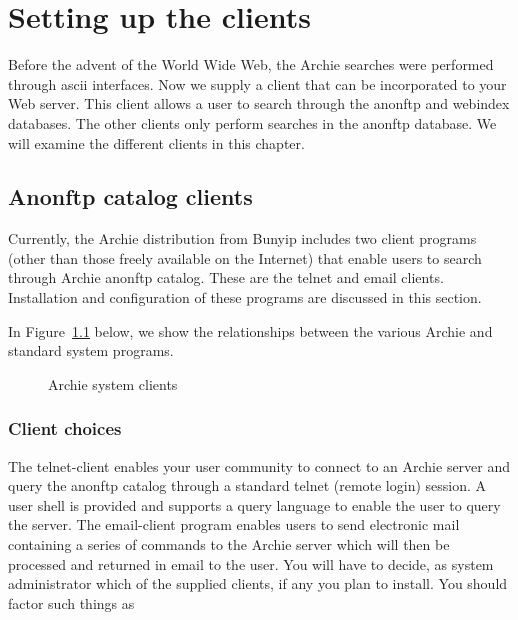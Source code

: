 %
%
%
%


\chapter{Setting up the clients}
\label{chap:clients}

Before the advent of the World Wide Web, the Archie searches were performed
through ascii interfaces. Now we supply a client that can be incorporated
to your Web server. This client allows a user to search through
the anonftp and webindex databases. The other clients only perform
searches in the anonftp database.
We will examine the different clients in this chapter.


\section{Anonftp catalog clients}

Currently, the Archie distribution from Bunyip includes two client programs
(other than those freely available on the Internet) that enable users to
search through Archie anonftp catalog. These are the telnet and email
clients. Installation and configuration of these programs are discussed in
this section.


In Figure~\ref{fig:clients} below, we show the relationships between the
various Archie and standard system programs.


\begin{figure}[!htb]
\begin{center}
\end{center}
\caption{Archie system clients}
\label{fig:clients}
\end{figure}


\subsection{Client choices}

The telnet-client enables your user community to connect to an Archie server
and query the anonftp catalog through a standard telnet (remote login)
session. A user shell is provided and supports a query language to enable the
user to query the server. The email-client program enables users to send
electronic mail containing a series of commands to the Archie server which
will then be processed and returned in email to the user. You will have to
decide, as system administrator which of the supplied clients, if any you plan
to install. You should factor such things as

